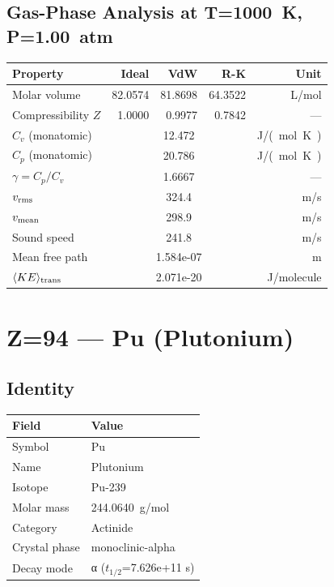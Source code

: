 \documentclass[11pt,a4paper]{article}
\begin{document}
\subsection{Gas-Phase Analysis at T=\SI{1000}{K}, P=\SI{1.00}{atm}}
\begin{tabular}{lrrrr}
  \toprule
  Property & Ideal & VdW & R-K & Unit \\
  \midrule
  Molar volume & 82.0574 & 81.8698 & 64.3522 & \si{L/mol} \\
  Compressibility $Z$ & 1.0000 & 0.9977 & 0.7842 & --- \\
  \midrule
  $C_v$ (monatomic) & \multicolumn{3}{c}{12.472} & \si{J/(mol.K)} \\
  $C_p$ (monatomic) & \multicolumn{3}{c}{20.786} & \si{J/(mol.K)} \\
  $\gamma = C_p/C_v$ & \multicolumn{3}{c}{1.6667} & --- \\
  $v_{\rm rms}$ & \multicolumn{3}{c}{324.4} & \si{m/s} \\
  $v_{\rm mean}$ & \multicolumn{3}{c}{298.9} & \si{m/s} \\
  Sound speed & \multicolumn{3}{c}{241.8} & \si{m/s} \\
  Mean free path & \multicolumn{3}{c}{1.584e-07} & \si{m} \\
  $\langle KE \rangle_{\rm trans}$ & \multicolumn{3}{c}{2.071e-20} & \si{J/molecule} \\
  \bottomrule
\end{tabular}

\newpage

\section{Z=94 --- Pu (Plutonium)}
\label{sec:Z94}

\subsection{Identity}
\begin{tabular}{ll}
  \toprule
  Field & Value \\
  \midrule
  Symbol & Pu \\
  Name & Plutonium \\
  Isotope & Pu-239 \\
  Molar mass & \SI{244.0640}{g/mol} \\
  Category & Actinide \\
  Crystal phase & monoclinic-alpha \\
  Decay mode & α ($t_{1/2}$=7.626e+11 s) \\
  \bottomrule
\end{tabular}
\end{document}
